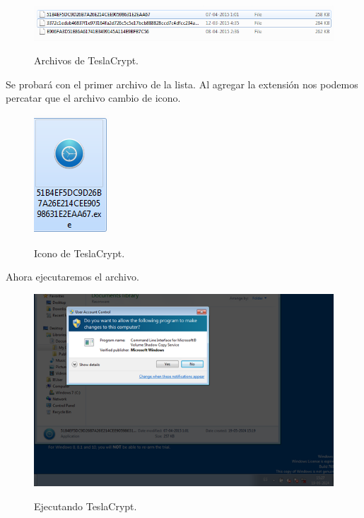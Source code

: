 \documentclass[stu, 11pt, letterpaper, donotrepeattitle, floatsintext, natbib]{apa7}
\begin{document}
\begin{figure}[H]
    \centering
    \caption{Archivos de TeslaCrypt.}
    \includegraphics[width=0.75\linewidth]{ram6.png} %
    \label{fig:OverallEffect}
\end{figure}

Se probará con el primer archivo de la lista. Al agregar la extensión nos podemos percatar que el archivo cambio de icono.

\begin{figure}[H]
    \centering
    \caption{Icono de TeslaCrypt.}
    \includegraphics[width=0.1\linewidth]{ram7.png} %
    \label{fig:OverallEffect}
\end{figure}

Ahora ejecutaremos el archivo.

\begin{figure}[H]
    \centering
    \caption{Ejecutando TeslaCrypt.}
    \includegraphics[width=0.75\linewidth]{ram81.png} %
    \label{fig:OverallEffect}
\end{figure}
\end{document}
